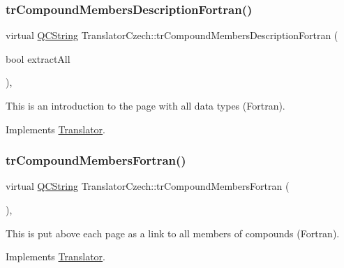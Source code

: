 \subsubsection{\texorpdfstring{trCompoundMembersDescriptionFortran()}{trCompoundMembersDescriptionFortran()}}
{\footnotesize\ttfamily virtual \mbox{\hyperlink{class_q_c_string}{Q\+C\+String}} Translator\+Czech\+::tr\+Compound\+Members\+Description\+Fortran (\begin{DoxyParamCaption}\item[{bool}]{extract\+All }\end{DoxyParamCaption})\hspace{0.3cm}{\ttfamily [inline]}, {\ttfamily [virtual]}}

This is an introduction to the page with all data types (Fortran). 

Implements \mbox{\hyperlink{class_translator}{Translator}}.

\mbox{\label{class_translator_czech_ad2f8f61b7d7d3dbac0737ce650533c7a}} 
\subsubsection{\texorpdfstring{trCompoundMembersFortran()}{trCompoundMembersFortran()}}
{\footnotesize\ttfamily virtual \mbox{\hyperlink{class_q_c_string}{Q\+C\+String}} Translator\+Czech\+::tr\+Compound\+Members\+Fortran (\begin{DoxyParamCaption}{ }\end{DoxyParamCaption})\hspace{0.3cm}{\ttfamily [inline]}, {\ttfamily [virtual]}}

This is put above each page as a link to all members of compounds (Fortran). 

Implements \mbox{\hyperlink{class_translator}{Translator}}.

\mbox{\label{class_translator_czech_aef9fd54ecb9da99a12d4dc87167a8d0e}} 
